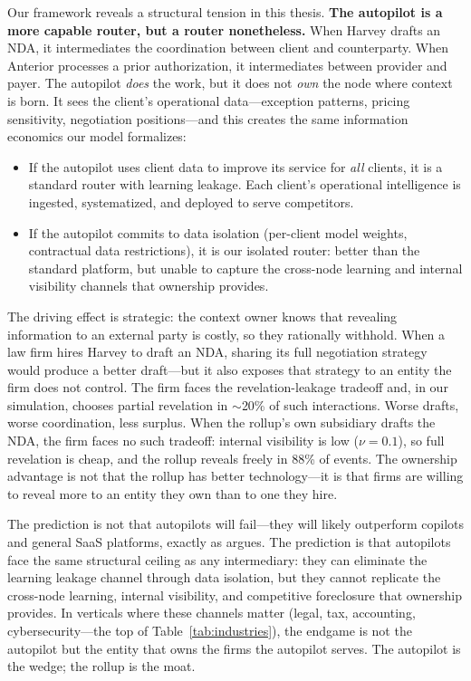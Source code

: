 \documentclass[12pt]{article}
\theoremstyle{definition}
\begin{document}
Our framework reveals a structural tension in this thesis. \textbf{The autopilot is a more capable router, but a router nonetheless.} When Harvey drafts an NDA, it intermediates the coordination between client and counterparty. When Anterior processes a prior authorization, it intermediates between provider and payer. The autopilot \textit{does} the work, but it does not \textit{own} the node where context is born. It sees the client's operational data---exception patterns, pricing sensitivity, negotiation positions---and this creates the same information economics our model formalizes:

\begin{itemize}[leftmargin=*]
\item If the autopilot uses client data to improve its service for \textit{all} clients, it is a standard router with learning leakage. Each client's operational intelligence is ingested, systematized, and deployed to serve competitors.

\item If the autopilot commits to data isolation (per-client model weights, contractual data restrictions), it is our isolated router: better than the standard platform, but unable to capture the cross-node learning and internal visibility channels that ownership provides.
\end{itemize}

\noindent The driving effect is strategic: the context owner knows that revealing information to an external party is costly, so they rationally withhold. When a law firm hires Harvey to draft an NDA, sharing its full negotiation strategy would produce a better draft---but it also exposes that strategy to an entity the firm does not control. The firm faces the revelation-leakage tradeoff and, in our simulation, chooses partial revelation in $\sim$20\% of such interactions. Worse drafts, worse coordination, less surplus. When the rollup's own subsidiary drafts the NDA, the firm faces no such tradeoff: internal visibility is low ($\nu = 0.1$), so full revelation is cheap, and the rollup reveals freely in 88\% of events. The ownership advantage is not that the rollup has better technology---it is that firms are willing to reveal more to an entity they own than to one they hire.

The prediction is not that autopilots will fail---they will likely outperform copilots and general SaaS platforms, exactly as \citet{sequoia2025services} argues. The prediction is that autopilots face the same structural ceiling as any intermediary: they can eliminate the learning leakage channel through data isolation, but they cannot replicate the cross-node learning, internal visibility, and competitive foreclosure that ownership provides. In verticals where these channels matter (legal, tax, accounting, cybersecurity---the top of Table~\ref{tab:industries}), the endgame is not the autopilot but the entity that owns the firms the autopilot serves. The autopilot is the wedge; the rollup is the moat.
\end{document}
